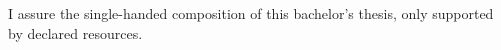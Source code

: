 
\clearemptydoublepage

\thispagestyle{empty}

\vspace*{0.8\textheight}
\noindent
I assure the single-handed composition of this bachelor's thesis, only supported by declared resources.

\vspace{15mm}
\noindent
\theplace \quad \thedate \hspace{4.5cm} \theauthor

\newpage

